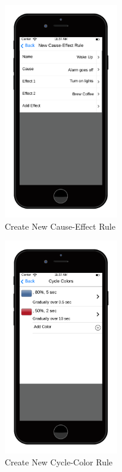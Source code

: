 \documentclass[12pt]{article}
\begin{document}
  \begin{figure}[ht!]
    \centering
    \includegraphics[width=50mm]{CauseEffect.png}
    \caption{Create New Cause-Effect Rule}
    \label{fig:newCauseEffectRule}
  \end{figure}
  
  \begin{figure}[ht!]
    \centering
    \includegraphics[width=50mm]{Cycle_Colors.png}
    \caption{Create New Cycle-Color Rule}
    \label{fig:newCycleColorRule}
  \end{figure}
  
\end{document}

